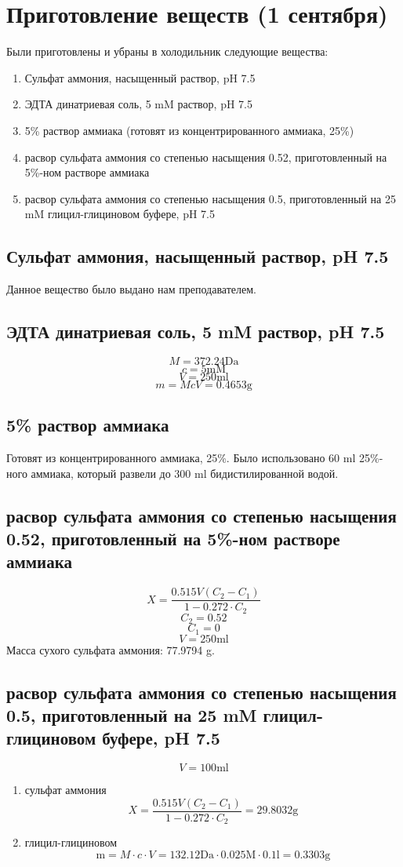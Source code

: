 
\section{Приготовление веществ (1 сентября)}

Были приготовлены и убраны в холодильник следующие вещества:
\begin{enumerate}
\item Сульфат аммония, насыщенный раствор, pH 7.5
\item ЭДТА динатриевая соль, 5 mM раствор, pH 7.5
\item 5\% раствор аммиака (готовят из концентрированного аммиака, 25\%)
\item расвор сульфата аммония со степенью насыщения 0.52,
    приготовленный на 5\%-ном растворе аммиака
\item расвор сульфата аммония со степенью насыщения 0.5,
    приготовленный на 25 mM глицил-глициновом буфере, pH 7.5
\end{enumerate}

\subsection{Сульфат аммония, насыщенный раствор, pH 7.5}
Данное вещество было выдано нам преподавателем.

\subsection{ЭДТА динатриевая соль, 5 mM раствор, pH 7.5}
$$ M = 372.24 \text{Da} $$
$$ c = 5 \text{mM} $$
$$ V = 250 \text{ml} $$
$$ m = McV = 0.4653 \text{g} $$

\subsection{5\% раствор аммиака}
Готовят из концентрированного аммиака, 25\%.
Было использовано 60 ml 25\%-ного аммиака, который развели до 300 ml бидистилированной водой.

\subsection{расвор сульфата аммония со степенью насыщения 0.52,
    приготовленный на 5\%-ном растворе аммиака}
$$ X = \frac{0.515 V(C_2 - C_1)}{1-0.272 \cdot C_2} $$
$$ C_2 = 0.52 $$
$$ C_1 = 0 $$
$$ V = 250 \text{ml} $$
Масса сухого сульфата аммония: 77.9794 g.

\subsection{расвор сульфата аммония со степенью насыщения 0.5,
    приготовленный на 25 mM глицил-глициновом буфере, pH 7.5}
$$ V = 100 \text{ml} $$
\begin{enumerate}
\item сульфат аммония
$$ X = \frac{0.515 V(C_2 - C_1)}{1-0.272 \cdot C_2} = 29.8032 \text{g} $$
\item глицил-глициновом
$$ \text{m} = M \cdot c \cdot V =
    132.12 \text{Da} \cdot 0.025 \text{M} \cdot 0.1 \text{l} = 0.3303 \text {g} $$
\end{enumerate}

